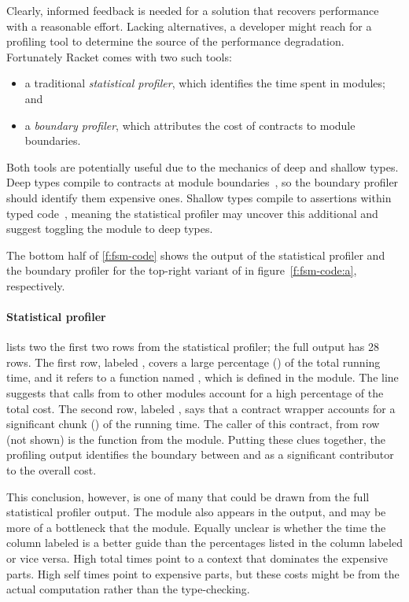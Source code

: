 Clearly, informed feedback is needed for a solution that recovers performance
with a reasonable effort. Lacking alternatives, a developer might reach for a
profiling tool to determine the source of the performance
degradation. Fortunately Racket comes with two such tools: 
\begin{itemize}

\item a traditional \emph{statistical profiler}, which identifies the time spent
 in modules; and

\item a \emph{boundary profiler}, which attributes the cost of contracts to
 module boundaries.
 
\end{itemize}
Both tools are potentially useful due to the mechanics of deep and shallow types.
Deep types compile to contracts at module boundaries~\cite{tf-popl-2008}, so
the boundary profiler should identify them expensive ones. 
Shallow types compile to assertions within typed code~\cite{glfd-pj-2022},
meaning the statistical profiler may uncover this additional and suggest
toggling the module to deep types. 

The bottom half of \cref{f:fsm-code} shows the output of the statistical
profiler and the boundary profiler for the top-right variant of  in
figure~\ref{f:fsm-code:a}, respectively.

\paragraph{Statistical profiler}  lists two the
first two rows from the statistical profiler; the full output has 28 rows.  The
first row, labeled \code{[17]}, covers a large percentage () of the
total running time, and it refers to a function named , which is
defined in the  module. The line suggests that calls from
 to other modules account for a high percentage of the total cost.
The second row, labeled \code{[24]}, says that a contract wrapper accounts for a
significant chunk () of the running time.  The caller of this
contract, from row \code{[19]} (not shown) is the function 
from the  module.  Putting these clues together, the profiling output
identifies the boundary between  and  as a significant
contributor to the overall cost. 

This conclusion, however, is one of many that could be drawn from the full
statistical profiler output.  The  module also appears in the output,
and may be more of a bottleneck that the  module.  Equally unclear is
whether the time the column labeled  is a better guide than the
percentages listed in the column labeled  or vice versa.  High total
times point to a context that dominates the expensive parts.  High self times
point to expensive parts, but these costs might be from the actual computation
rather than the type-checking.

